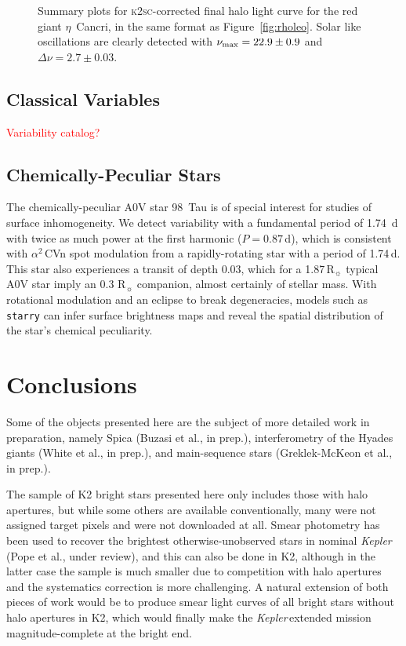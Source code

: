 \documentclass[modern]{aastex62}
\newcommand{\numax}{\mbox{$\nu_{\rm max}$}\xspace}
\newcommand{\Dnu}{\mbox{$\Delta \nu$}\xspace}
\newcommand{\rsun}{\mbox{$\mathrm{R}_{\sun}$}\xspace}
\newcommand\kepler{\emph{Kepler}\,}
\begin{document}
\begin{figure*}
\caption{Summary plots for \textsc{k2sc}-corrected final halo light curve for the red giant $\eta$~Cancri, in the same format as Figure~\ref{fig:rholeo}. Solar like oscillations are clearly detected with $\numax = 22.9 \pm 0.9$ and $\Dnu = 2.7 \pm 0.03$.}
\label{fig:etacnc}
\end{figure*}


\subsection{Classical Variables}
\label{sec:variables}
\textcolor{red}{Variability catalog?}


\subsection{Chemically-Peculiar Stars}

The chemically-peculiar A0V star 98~Tau is of special interest for studies of surface inhomogeneity. We detect variability with a fundamental period of 1.74~d with twice as much power at the first harmonic ($P = 0.87$\,d), which is consistent with $\alpha^2$\,CVn spot modulation from a rapidly-rotating star with a period of 1.74\,d. This star also experiences a transit of depth 0.03, which for a 1.87\,\rsun typical A0V star imply an 0.3 \rsun companion, almost certainly of stellar mass. With rotational modulation and an eclipse to break degeneracies, models such as \texttt{starry} \citep{starry} can infer surface brightness maps and reveal the spatial distribution of the star's chemical peculiarity. 

\section{Conclusions}
\label{sec:conclusions}


Some of the objects presented here are the subject of more detailed work in preparation, namely Spica (Buzasi et al., in prep.), interferometry of the Hyades giants (White et al., in prep.), and main-sequence stars (Greklek-McKeon et al., in prep.). 

The sample of K2 bright stars presented here only includes those with halo apertures, but while some others are available conventionally, many were not assigned target pixels and were not downloaded at all. Smear photometry has been used to recover the brightest otherwise-unobserved stars in nominal \kepler (Pope et al., under review), and this can also be done in K2, although in the latter case the sample is much smaller due to competition with halo apertures and the systematics correction is more challenging. A natural extension of both pieces of work would be to produce smear light curves of all bright stars without halo apertures in K2, which would finally make the \kepler extended mission magnitude-complete at the bright end. 
\end{document}

